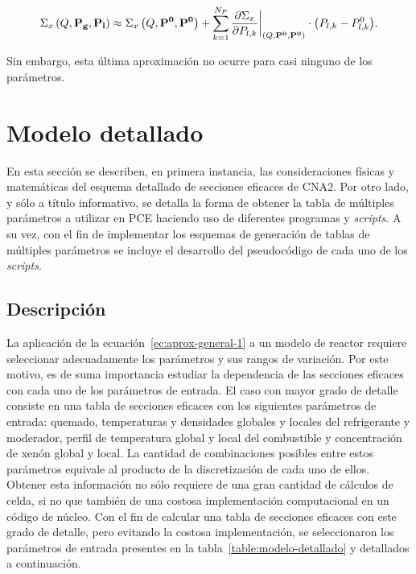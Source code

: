 \documentclass[11pt]{article}
\renewcommand{\vec}[1]{\ensuremath\mathbf{#1}}
\begin{document}
\begin{equation} \label{ec:aprox-general-6}
 \Sigma_x \left( Q, \vec{P_g}, \vec{P_l} \right) \approx 
 \Sigma_x \left( Q, \vec{P^0}, \vec{P^0} \right) + 
 \sum_{k = 1}^{N_P}{\frac{\partial\Sigma_x}{\partial P_{l,k}}\bigg|_{\left( Q, \vec{P^0}, \vec{P^0} \right)} \cdot \left(P_{l,k} - P^0_{l,k} \right) }.
\end{equation}

\noindent
Sin embargo, esta última aproximación no ocurre para casi ninguno de los parámetros.


\section{Modelo detallado}
\label{sec:modelo-detallado}

En esta sección se describen, en primera instancia, las consideraciones físicas y matemáticas del esquema detallado de secciones eficaces de CNA2. Por otro lado, y sólo a título informativo, se detalla la forma de obtener la tabla de múltiples parámetros a utilizar en PCE haciendo uso de diferentes programas y \emph{scripts}. A su vez, con el fin de implementar los esquemas de generación de tablas de múltiples parámetros se incluye el desarrollo del pseudocódigo de cada uno de los \emph{scripts}.


\subsection{Descripción}

La aplicación de la ecuación~\ref{ec:aprox-general-1} a un modelo de reactor requiere seleccionar adecuadamente los parámetros y sus rangos de variación. Por este motivo, es de suma importancia estudiar la dependencia de las secciones eficaces con cada uno de los parámetros de entrada. El caso con mayor grado de detalle consiste en una tabla de secciones eficaces con los siguientes parámetros de entrada: quemado, temperaturas y densidades globales y locales del refrigerante y moderador, perfil de temperatura global y local del combustible y concentración de xenón global y local. La cantidad de combinaciones posibles entre estos parámetros equivale al producto de la discretización de cada uno de ellos. Obtener esta información no sólo requiere de una gran cantidad de cálculos de celda, si no que también de una costosa implementación computacional en un código de núcleo. Con el fin de calcular una tabla de secciones eficaces con este grado de detalle, pero evitando la costosa implementación, se seleccionaron los parámetros de entrada presentes en la tabla~\ref{table:modelo-detallado} y detallados a continuación.
\end{document}
